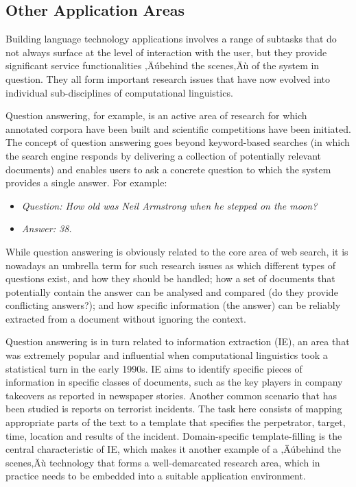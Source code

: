 \begin{multicols}{2}
\subsection{Other Application Areas}

Building language technology applications involves a range of subtasks
that do not always surface at the level of interaction with the user,
but they provide significant service functionalities
‚Äúbehind the scenes‚Äù of the system in
question. They all form important research issues that have now
evolved into individual sub-disciplines of computational linguistics. 

Question answering, for example, is an active area of research for which annotated corpora have been built and scientific competitions have been initiated. The concept of question answering goes beyond keyword-based searches (in which the search engine responds by delivering a collection of potentially relevant documents) and enables users to ask a concrete question to which the system provides a single answer. For example:

\begin{itemize}
\item[] \textit{Question: How old was Neil Armstrong when he stepped on the moon?}
\item[] \textit{Answer: 38.}
\end{itemize}

While question answering is obviously related to the core area of web search, it is nowadays an umbrella term for such research issues as which different types of questions exist, and how they should be handled; how a set of documents that potentially contain the answer can be analysed and compared (do they provide conflicting answers?); and how specific information (the answer) can be reliably extracted from a document without ignoring the context. 



Question answering is in turn related to information extraction (IE), an area that was extremely popular and influential when computational linguistics took a statistical turn in the early 1990s. IE aims to identify specific pieces of information in specific classes of documents, such as the key players in company takeovers as reported in newspaper stories. Another common scenario that has been studied is reports on terrorist incidents. The task here consists of mapping appropriate parts of the text to a template that specifies the perpetrator, target, time, location and results of the incident. Domain-specific template-filling is the central characteristic of IE, which makes it another example of a ‚Äúbehind the scenes‚Äù technology that forms a well-demarcated research area, which in practice needs to be embedded into a suitable application environment.


\end{multicols}

